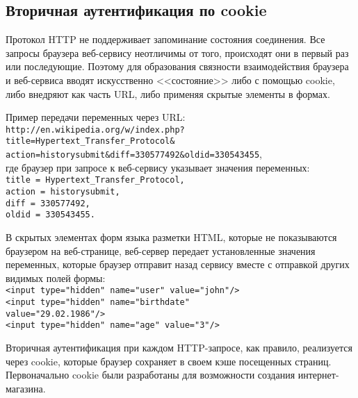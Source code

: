 \subsection{Вторичная аутентификация по cookie}

Протокол HTTP не поддерживает запоминание состояния соединения. Все запросы браузера веб-сервису неотличимы от того, происходят они в первый раз или последующие. Поэтому для образования связности взаимодействия браузера и веб-сервиса вводят искусственно <<состояние>> либо с помощью cookie, либо внедряют как часть URL, либо применяя скрытые элементы в формах.

Пример передачи переменных через URL: \\
\texttt{http://en.wikipedia.org/w/index.php? \\
\hspace*{1 cm} title=Hypertext\_Transfer\_Protocol\& \\
\hspace*{1 cm} action=historysubmit\&diff=330577492\&oldid=330543455}, \\
где браузер при запросе к веб-сервису указывает значения переменных: \texttt{ \\
\hspace*{1 cm} title = Hypertext\_Transfer\_Protocol, \\
\hspace*{1 cm} action = historysubmit, \\
\hspace*{1 cm} diff = 330577492, \\
\hspace*{1 cm} oldid = 330543455.
}

В скрытых элементах форм языка разметки HTML, которые не показываются браузером на веб-странице, веб-сервер передает установленные значения переменных, которые браузер отправит назад сервису вместе с отправкой других видимых полей формы: \texttt{ \\
\hspace*{1 cm} <input type="hidden"\ name="user"\ value="john"/> \\
\hspace*{1 cm} <input type="hidden"\ name="birthdate" \\
\hspace*{2 cm}      value="29.02.1986"/> \\
\hspace*{1 cm} <input type="hidden"\ name="age"\ value="3"/>
}

Вторичная аутентификация при каждом HTTP-запросе, как правило, реализуется через cookie, которые браузер сохраняет в своем кэше посещенных страниц. Первоначально cookie были разработаны для возможности создания интернет-магазина.

